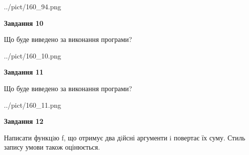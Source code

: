 \documentclass[12pt, ukrainian]{article}
\begin{document}
{\begin {large}
\begin{center}
	{../pict/160_94.png}
\end{center}
\newpage

{\begin {center}\textbf{Завдання 10}\end {center}}

Що буде виведено за виконання програми?\par
\begin{center}
	{../pict/160_10.png}
\end{center}
\newpage

{\begin {center}\textbf{Завдання 11}\end {center}}

Що буде виведено за виконання програми?\par
\begin{center}
	{../pict/160_11.png}
\end{center}
\newpage

{\begin {center}\textbf{Завдання 12}\end {center}}


Написати функцiю f, що отримує два дiйсні аргументи i повертає їх суму. Стиль запису умови також оцінюється.\par
\newpage

\end {large}}
\end{document}
